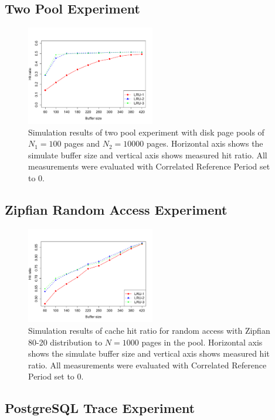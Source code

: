 \subsection{Two Pool Experiment}

\begin{figure}[t!]
    \centering
	\includegraphics[width=0.5\textwidth]{./figures/two_pool.pdf}
	\caption{Simulation results of two pool experiment with disk page pools of $N_1 = 100$ pages and $N_2 = 10000$ pages. Horizontal axis shows the simulate buffer size and vertical axis shows measured hit ratio. All measurements were evaluated with Correlated Reference Period set to 0.}
	\label{fig:two_pool}
\end{figure}


\subsection{Zipfian Random Access Experiment}

\begin{figure}[t!]
    \centering
	\includegraphics[width=0.5\textwidth]{./figures/zipfian.pdf}
	\caption{Simulation results of cache hit ratio for random access with Zipfian 80-20 distribution to $N = 1000$ pages in the pool. Horizontal axis shows the simulate buffer size and vertical axis shows measured hit ratio. All measurements were evaluated with Correlated Reference Period set to 0.}
	\label{fig:zipfian}
\end{figure}


\subsection{PostgreSQL Trace Experiment}

